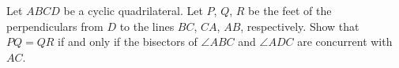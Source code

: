 Let $ABCD$ be a cyclic quadrilateral. Let $P$, $Q$, $R$ be the feet of the perpendiculars from $D$ to the lines $BC$, $CA$, $AB$, respectively. Show that $PQ = QR$ if and only if the bisectors of $\angle ABC$ and $\angle ADC$ are concurrent with $AC$.
